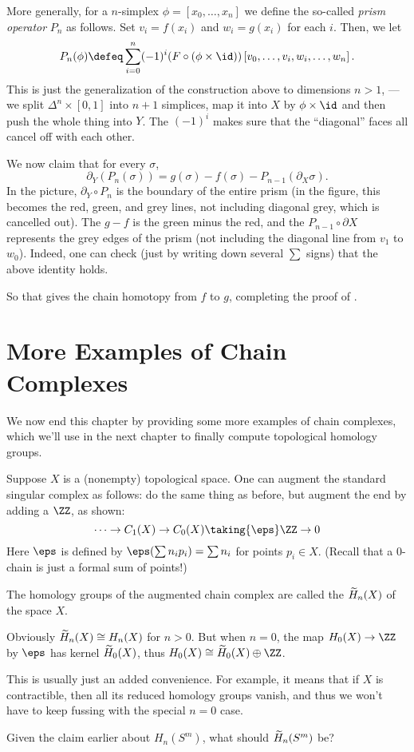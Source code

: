 More generally, for a $n$-simplex $\phi = [x_0, \dots, x_n]$ we define the so-called \emph{prism operator} $P_n$
as follows. Set $v_i = f(x_i)$ and $w_i = g(x_i)$ for each $i$.
Then, we let
\[ P_n(\phi) \defeq \sum_{i=0}^n (-1)^i (F \circ (\phi\times\id)) \left[ v_0, \dots, v_i, w_i, \dots, w_n \right]. \]
This is just the generalization of the construction above to dimensions $n > 1$,
--- we split $\Delta^n \times [0,1]$ into $n+1$ simplices,
map it into $X$ by $\phi \times \id$ and then push the whole thing into $Y$.
The $(-1)^i$ makes sure that the ``diagonal'' faces all cancel off with each other.

We now claim that for every $\sigma$,
\[ \partial_Y(P_n(\sigma)) = g(\sigma) - f(\sigma) - P_{n-1}(\partial_X\sigma). \]
In the picture, $\partial_Y \circ P_n$ is the boundary of the entire prism
(in the figure, this becomes the red, green, and grey lines, not including diagonal grey,
which is cancelled out).
The $g-f$ is the green minus the red,
and the $P_{n-1} \circ \partial X$ represents the grey edges of the prism
(not including the diagonal line from $v_1$ to $w_0$).
Indeed, one can check (just by writing down several $\sum$ signs)
that the above identity holds.

So that gives the chain homotopy from $f$ to $g$, completing the proof of .

\section{More Examples of Chain Complexes}
We now end this chapter by providing some more examples of chain complexes,
which we'll use in the next chapter to finally compute topological homology groups.

\begin{example}
	Suppose $X$ is a (nonempty) topological space.
	One can augment the standard singular complex as follows:
	do the same thing as before, but augment the end by adding a $\ZZ$,
	as shown:
	\[ \dots \to C_1(X) \to C_0(X) \taking{\eps} \ZZ \to 0 \]
	Here $\eps$ is defined by $\eps(\sum n_ip_i) = \sum n_i$ for points $p_i \in X$.
	(Recall that a $0$-chain is just a formal sum of points!)
\end{example}
\begin{definition}
	\label{def:augment}
	The homology groups of the augmented chain complex are called the
	 $\widetilde H_n(X)$ of the space $X$.

	Obviously $\widetilde H_n(X) \cong H_n(X)$ for $n > 0$.
	But when $n=0$, the map $H_0(X) \to \ZZ$ by $\eps$ has kernel $\widetilde H_0(X)$,
	thus $H_0(X) \cong \wt H_0(X) \oplus \ZZ$.
\end{definition}
This is usually just an added convenience.
For example, it means that if $X$ is contractible,
then all its reduced homology groups vanish,
and thus we won't have to keep fussing with the special $n=0$ case.
\begin{ques}
	Given the claim earlier about $H_n(S^m)$, what should $\widetilde H_n(S^m)$ be?
\end{ques}

